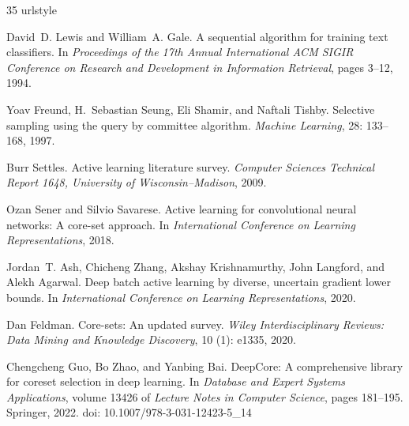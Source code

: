 \documentclass[12pt]{article}
\begin{document}
\begin{thebibliography}{35}
\providecommand{\natexlab}[1]{#1}
\providecommand{\url}[1]{\texttt{#1}}
\expandafter\ifx\csname urlstyle\endcsname\relax
  \providecommand{\doi}[1]{doi: #1}\else
  \providecommand{\doi}{doi: \begingroup \urlstyle{rm}\Url}\fi

David~D. Lewis and William~A. Gale.
\newblock A sequential algorithm for training text classifiers.
\newblock In \emph{Proceedings of the 17th Annual International ACM SIGIR
  Conference on Research and Development in Information Retrieval}, pages 3--12,
  1994.

Yoav Freund, H.~Sebastian Seung, Eli Shamir, and Naftali Tishby.
\newblock Selective sampling using the query by committee algorithm.
\newblock \emph{Machine Learning}, 28: 133--168, 1997.

Burr Settles.
\newblock Active learning literature survey.
\newblock \emph{Computer Sciences Technical Report 1648, University of
  Wisconsin--Madison}, 2009.

Ozan Sener and Silvio Savarese.
\newblock Active learning for convolutional neural networks: A core-set
  approach.
\newblock In \emph{International Conference on Learning Representations}, 2018.

Jordan~T. Ash, Chicheng Zhang, Akshay Krishnamurthy, John Langford, and Alekh
  Agarwal.
\newblock Deep batch active learning by diverse, uncertain gradient lower
  bounds.
\newblock In \emph{International Conference on Learning Representations}, 2020.

Dan Feldman.
\newblock Core-sets: An updated survey.
\newblock \emph{Wiley Interdisciplinary Reviews: Data Mining and Knowledge
  Discovery}, 10 (1): e1335, 2020.

Chengcheng Guo, Bo Zhao, and Yanbing Bai.
\newblock DeepCore: A comprehensive library for coreset selection in deep
  learning.
\newblock In \emph{Database and Expert Systems Applications}, volume 13426 of
  \emph{Lecture Notes in Computer Science}, pages 181--195. Springer, 2022.
\newblock \doi{10.1007/978-3-031-12423-5_14}


\end{thebibliography}
\end{document}

